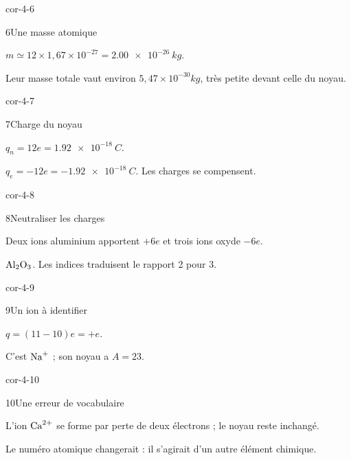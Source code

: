 \begin{blocLivre}{cor-4-6}\begin{corrige}{6}{Une masse atomique}
\begin{questions}
\item $m\simeq12\times1,67\times10^{-27}=\qty{2,00e-26}{kg}$.
\item Leur masse totale vaut environ $5,47\times10^{-30}\unit{kg}$, très petite devant celle du noyau.
\end{questions}
\end{corrige}\end{blocLivre}
\begin{blocLivre}{cor-4-7}\begin{corrige}{7}{Charge du noyau}
\begin{questions}
\item $q_n=12e=\qty{1,92e-18}{C}$.
\item $q_e=-12e=\qty{-1,92e-18}{C}$. Les charges se compensent.
\end{questions}
\end{corrige}\end{blocLivre}
\begin{blocLivre}{cor-4-8}\begin{corrige}{8}{Neutraliser les charges}
\begin{questions}
\item Deux ions aluminium apportent $+6e$ et trois ions oxyde $-6e$.
\item $\ce{Al2O3}$. Les indices traduisent le rapport 2 pour 3.
\end{questions}
\end{corrige}\end{blocLivre}
\begin{blocLivre}{cor-4-9}\begin{corrige}{9}{Un ion à identifier}
\begin{questions}
\item $q=(11-10)e=+e$.
\item C’est $\ce{Na+}$ ; son noyau a $A=23$.
\end{questions}
\end{corrige}\end{blocLivre}
\begin{blocLivre}{cor-4-10}\begin{corrige}{10}{Une erreur de vocabulaire}
\begin{questions}
\item L’ion $\ce{Ca^{2+}}$ se forme par perte de deux électrons ; le noyau reste inchangé.
\item Le numéro atomique changerait : il s’agirait d’un autre élément chimique.
\end{questions}
\end{corrige}\end{blocLivre}
